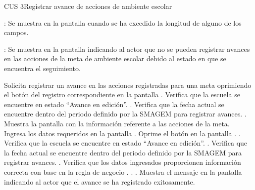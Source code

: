 \begin{UseCase}{CUS 3}{Registrar avance de acciones de ambiente escolar}
{\begin{UClist}
        \UCli {}: Se muestra en la pantalla  cuando se ha excedido la longitud de alguno de los campos.    
        
        \UCli {}: Se muestra en la pantalla  indicando al actor que no se pueden registrar avances en las acciones de la meta de ambiente escolar debido al estado en que se encuentra el seguimiento.
    \end{UClist}
    }

    


\end{UseCase}


\begin{UCtrayectoria}
    \UCpaso[\UCactor] Solicita registrar un avance en las acciones registradas para una meta oprimiendo el botón \botAutoAjus del registro correspondiente en la pantalla .
     \UCpaso[\UCsist] Verifica que la escuela se encuentre en estado ``Avance en edición''. .
    \UCpaso[\UCsist] Verifica que la fecha actual se encuentre dentro del periodo definido por la SMAGEM para registrar avances. .
    \UCpaso[\UCsist] Muestra la pantalla  con la información referente a las acciones de la meta. 
    \UCpaso[\UCactor] Ingresa los datos requeridos en la pantalla . \label{cus3:RegAvance}
    \UCpaso[\UCactor] Oprime el botón  en la pantalla . .
    \UCpaso[\UCsist] Verifica que la escuela se encuentre en estado ``Avance en edición''. .
    \UCpaso[\UCsist] Verifica que la fecha actual se encuentre dentro del periodo definido por la SMAGEM para registrar avances. .
    \UCpaso[\UCsist] Verifica que los datos ingresados proporcionen información correcta con base en la regla de negocio . . .  
    \UCpaso[\UCsist] Muestra el mensaje  en la pantalla  indicando al actor que el avance se ha registrado exitosamente.
\end{UCtrayectoria}
 

